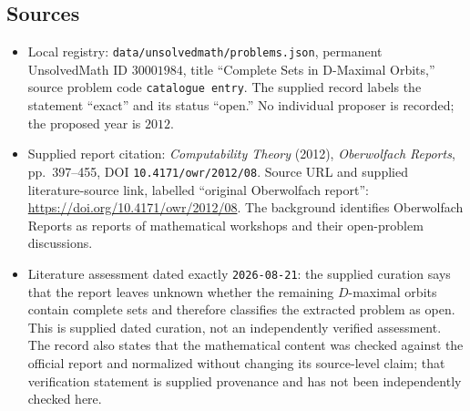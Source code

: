 \documentclass[11pt]{article}
\begin{document}
\subsection{Sources}
\begin{itemize}
\item Local registry: \texttt{data/unsolvedmath/problems.json}, permanent UnsolvedMath ID \(30001984\), title ``Complete Sets in D-Maximal Orbits,'' source problem code \texttt{catalogue entry}. The supplied record labels the statement ``exact'' and its status ``open.'' No individual proposer is recorded; the proposed year is \(2012\).
\item Supplied report citation: \emph{Computability Theory} (2012), \emph{Oberwolfach Reports}, pp.~397--455, DOI \texttt{10.4171/owr/2012/08}. Source URL and supplied literature-source link, labelled ``original Oberwolfach report'': \url{https://doi.org/10.4171/owr/2012/08}. The background identifies Oberwolfach Reports as reports of mathematical workshops and their open-problem discussions.
\item Literature assessment dated exactly \texttt{2026-08-21}: the supplied curation says that the report leaves unknown whether the remaining \(D\)-maximal orbits contain complete sets and therefore classifies the extracted problem as open. This is supplied dated curation, not an independently verified assessment. The record also states that the mathematical content was checked against the official report and normalized without changing its source-level claim; that verification statement is supplied provenance and has not been independently checked here.
\end{itemize}
\end{document}
